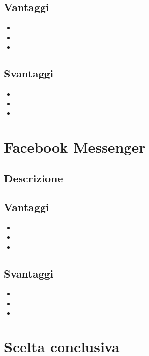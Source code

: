 \documentclass[11pt,notitlepage]{article}
\begin{document}
\subsection*{Vantaggi}
\begin{itemize}
		\item 
		\item  
		\item 
\end{itemize} 

\subsection*{Svantaggi}
\begin{itemize}
		\item 
		\item  
		\item 
\end{itemize} 

\bigskip
\section*{Facebook Messenger}
\subsection*{Descrizione}

\subsection*{Vantaggi}
\begin{itemize}
		\item 
		\item  
		\item 
\end{itemize} 

\subsection*{Svantaggi}
\begin{itemize}
		\item 
		\item  
		\item 
\end{itemize} 

\bigskip
\section*{Scelta conclusiva}
\end{document}
